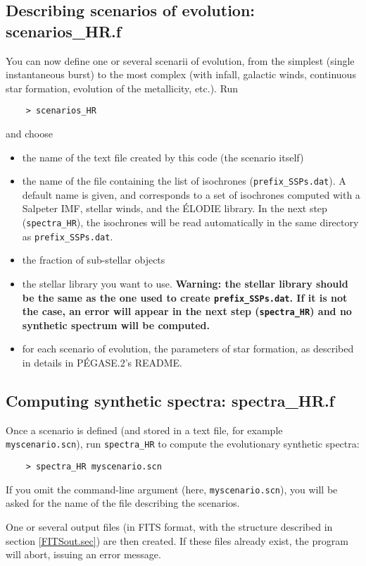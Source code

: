 \documentclass[11pt,fleqn]{article}
\begin{document}
\subsection{Describing scenarios of evolution: scenarios\_HR.f}
You can now define one or several scenarii of evolution, from the simplest (single
instantaneous burst) to the most complex (with infall, galactic winds,
continuous star formation, evolution of the metallicity, etc.).
Run 
\begin{verbatim}
    > scenarios_HR
\end{verbatim}
and choose 
\begin{itemize}
\item the name of the text file created by this code (the scenario
  itself)
\item the name of the file containing the list of isochrones
  (\texttt{prefix\_SSPs.dat}). A default name is given, and corresponds
  to a set of isochrones computed with a Salpeter IMF, stellar winds,
  and the \'ELODIE library. In the next step (\texttt{spectra\_HR}),
  the isochrones will be read automatically  in the same directory as
  \texttt{prefix\_SSPs.dat}.

\item the fraction of sub-stellar objects
\item the stellar library you want to use. {\bf Warning: the stellar
  library should be the same as the one used to create
  \texttt{prefix\_SSPs.dat}. If it is not the case,  an
  error will appear in the next step
  (\texttt{spectra\_HR})  and no  synthetic spectrum will be computed.}
\item for each scenario of evolution, the parameters of star
  formation, as described in details in P\'EGASE.2's README.
\end{itemize}


\subsection{Computing synthetic spectra: spectra\_HR.f}
Once a scenario is defined (and stored in a text file, for example
 \texttt{myscenario.scn}),
 run \texttt{spectra\_HR}  to compute the evolutionary synthetic  spectra:
\begin{verbatim}
    > spectra_HR myscenario.scn
\end{verbatim}
If you omit the command-line argument (here, \texttt{myscenario.scn}), you will be
asked for the name of the file describing the scenarios.

One or several output files (in FITS format, with the structure
described in section \ref{FITSout.sec}) are then created. If these files
already exist, the program will abort, issuing an error message.
\end{document}
